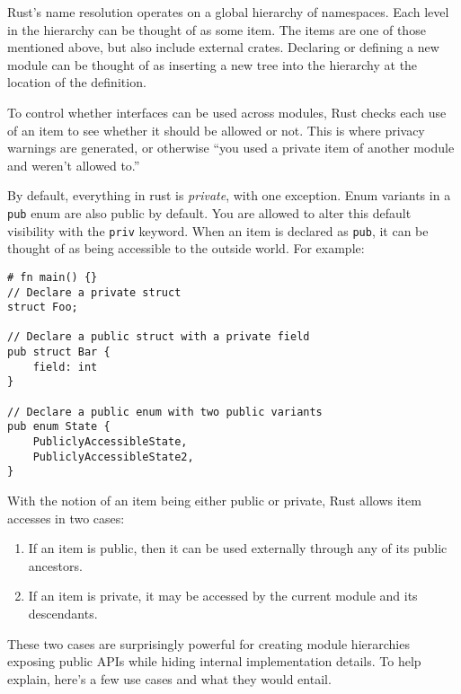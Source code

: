 \documentclass[]{article}
\begin{document}
Rust's name resolution operates on a global hierarchy of namespaces.
Each level in the hierarchy can be thought of as some item. The items
are one of those mentioned above, but also include external crates.
Declaring or defining a new module can be thought of as inserting a new
tree into the hierarchy at the location of the definition.

To control whether interfaces can be used across modules, Rust checks
each use of an item to see whether it should be allowed or not. This is
where privacy warnings are generated, or otherwise ``you used a private
item of another module and weren't allowed to.''

By default, everything in rust is \emph{private}, with one exception.
Enum variants in a \texttt{pub} enum are also public by default. You are
allowed to alter this default visibility with the \texttt{priv} keyword.
When an item is declared as \texttt{pub}, it can be thought of as being
accessible to the outside world. For example:

\begin{verbatim}
# fn main() {}
// Declare a private struct
struct Foo;

// Declare a public struct with a private field
pub struct Bar {
    field: int
}

// Declare a public enum with two public variants
pub enum State {
    PubliclyAccessibleState,
    PubliclyAccessibleState2,
}
\end{verbatim}

With the notion of an item being either public or private, Rust allows
item accesses in two cases:

\begin{enumerate}
\def\labelenumi{\arabic{enumi}.}
\itemsep1pt\parskip0pt
\item
  If an item is public, then it can be used externally through any of
  its public ancestors.
\item
  If an item is private, it may be accessed by the current module and
  its descendants.
\end{enumerate}

These two cases are surprisingly powerful for creating module
hierarchies exposing public APIs while hiding internal implementation
details. To help explain, here's a few use cases and what they would
entail.
\end{document}
